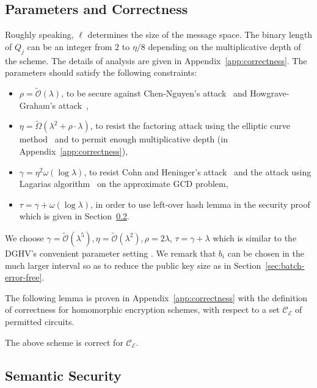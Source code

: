 \documentclass[11pt]{llncs}
\begin{document}
\subsection{Parameters and Correctness}\label{parameter}
Roughly speaking, $\ell$ determines the size of the message space.
The binary length of $Q_j$ can be an integer from $2$ to $\eta/8$ depending on the multiplicative depth of the scheme. The details of analysis are given in Appendix~\ref{app:correctness}.
The parameters should satisfy the following constraints: 
\begin{itemize}
\renewcommand{\labelitemi}{\tiny $\bullet$}
\itemsep.4em
\item $\rho=\tilde{\mathcal{O}}(\lambda)$, to be secure against Chen-Nguyen's attack~\cite{CN2012} and Howgrave-Graham's attack~\cite{How2001},
\item $\eta=\tilde{\Omega}(\lambda^2 +\rho\cdot \lambda)$, to resist the factoring attack using the elliptic curve method~\cite{Len1987} and to permit enough multiplicative depth (in Appendix~\ref{app:correctness}),
\item $\gamma=\eta^2\omega(\log \lambda)$, to resist Cohn and Heninger's attack~\cite{CH2011} and the attack using Lagarias algorithm~\cite{Lag1985} on the approximate GCD problem,
\item $\tau=\gamma+\omega(\log\lambda)$, in order to use left-over hash lemma in the security proof which is given in Section~\ref{reduce_acd}.
\end{itemize}
We choose $\gamma=\tilde{\mathcal{O}}(\lambda^5), \eta=\tilde{\mathcal{O}}(\lambda^2),
\rho=2\lambda$, $\tau=\gamma+\lambda$ which is similar to the DGHV's convenient parameter setting \cite{vDGHV2010}. We remark that $b_i$ can be chosen in the much larger interval so as to reduce the public key size as in Section~\ref{sec:batch-error-free}. 

The following lemma is proven in Appendix~\ref{app:correctness} with the definition of correctness for
homomorphic encryption schemes, with respect to a set
$\mathcal{C_E}$ of permitted circuits.

\begin{lemma}\label{lem:correctness}
The above scheme is correct for $\mathcal{C_E}$.
\end{lemma}

\subsection{Semantic Security}\label{reduce_acd}
\end{document}
